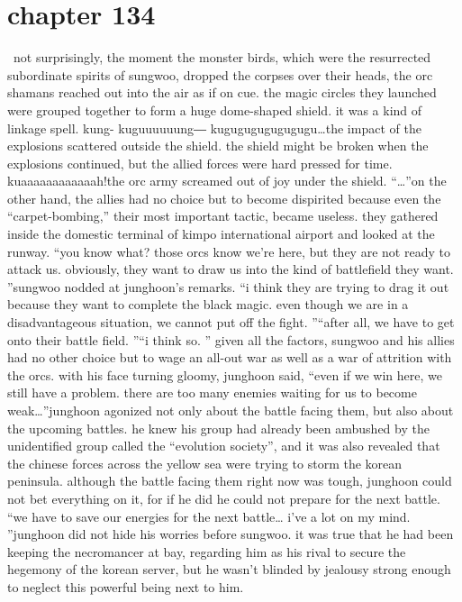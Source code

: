 \section{chapter 134}






 not surprisingly, the moment the monster birds, which were the resurrected subordinate spirits of sungwoo, dropped the corpses over their heads, the orc shamans reached out into the air as if on cue.
 the magic circles they launched were grouped together to form a huge dome-shaped shield.
 it was a kind of linkage spell.
kung- kuguuuuuung― kugugugugugugugu…the impact of the explosions scattered outside the shield.
 the shield might be broken when the explosions continued, but the allied forces were hard pressed for time.
kuaaaaaaaaaaaah!the orc army screamed out of joy under the shield.
“…”on the other hand, the allies had no choice but to become dispirited because even the “carpet-bombing,” their most important tactic, became useless.
they gathered inside the domestic terminal of kimpo international airport and looked at the runway.
“you know what? those orcs know we’re here, but they are not ready to attack us.
 obviously, they want to draw us into the kind of battlefield they want.
”sungwoo nodded at junghoon’s remarks.
“i think they are trying to drag it out because they want to complete the black magic.
 even though we are in a disadvantageous situation, we cannot put off the fight.
”“after all, we have to get onto their battle field.
”“i think so.
”
given all the factors, sungwoo and his allies had no other choice but to wage an all-out war as well as a war of attrition with the orcs.
with his face turning gloomy, junghoon said, “even if we win here, we still have a problem.
 there are too many enemies waiting for us to become weak…”junghoon agonized not only about the battle facing them, but also about the upcoming battles.
he knew his group had already been ambushed by the unidentified group called the “evolution society”, and it was also revealed that the chinese forces across the yellow sea were trying to storm the korean peninsula.
although the battle facing them right now was tough, junghoon could not bet everything on it, for if he did he could not prepare for the next battle.
“we have to save our energies for the next battle… i’ve a lot on my mind.
”junghoon did not hide his worries before sungwoo.
 it was true that he had been keeping the necromancer at bay, regarding him as his rival to secure the hegemony of the korean server, but he wasn’t blinded by jealousy strong enough to neglect this powerful being next to him.
